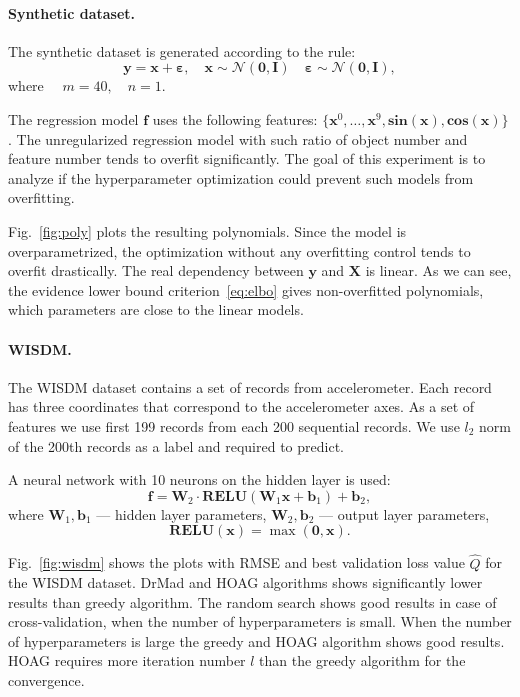 \documentclass[smallcondensed]{svjour3}
\begin{document}
\paragraph{Synthetic dataset.}
The synthetic dataset is generated according to the rule:
\[
	\mathbf{y} = \mathbf{x} + \boldsymbol{\varepsilon},\quad \mathbf{x}  \sim \mathcal{N}(\mathbf{0}, \mathbf{I}) \quad \boldsymbol{\varepsilon} \sim \mathcal{N}(\mathbf{0}, \mathbf{I}),
\]
where $\quad m = 40, \quad n = 1.$

The regression model $\mathbf{f}$ uses the following features: $\{\mathbf{x}^0, \dots, \mathbf{x}^9, \textbf{sin}(\mathbf{x}), \textbf{cos}(\mathbf{x})\}$. The unregularized regression model with such ratio of  object number and feature number tends to overfit significantly. The goal of this experiment is to analyze if the hyperparameter optimization could prevent such models from overfitting.

Fig.~\ref{fig:poly} plots the resulting polynomials.  Since the model is overparametrized, the optimization without any overfitting control tends to overfit drastically. The real dependency between $\mathbf{y}$ and $\mathbf{X}$ is linear. As we can see, the evidence lower bound criterion~\eqref{eq:elbo} gives non-overfitted polynomials, which parameters are close to the linear models.

\paragraph{WISDM.}
The WISDM dataset contains a set of records from accelerometer. Each record has three coordinates that correspond to the accelerometer axes. As a set of features we use first 199  records from each 200 sequential records. We use $l_2$ norm of the 200th records as a label and required to predict. 

A neural network with 10 neurons on the hidden layer is used:
\[
    \mathbf{f} = \mathbf{W}_2 \cdot \textbf{RELU}(\mathbf{W}_1\mathbf{x} + \mathbf{b}_1) +\mathbf{b}_2,
\]
where $\mathbf{W}_1, \mathbf{b}_1$ --- hidden layer parameters,
$\mathbf{W}_2, \mathbf{b}_2$ --- output layer parameters,
\[
    \textbf{RELU}(\mathbf{x}) = \max(\mathbf{0}, \mathbf{x}).
\]

Fig.~\ref{fig:wisdm} shows the plots with RMSE and best validation loss value $\hat{Q}$ for the WISDM dataset.
DrMad and HOAG algorithms shows significantly lower results than greedy algorithm. The random search shows good results in case of cross-validation, when the number of hyperparameters is small. When the number of hyperparameters is large the greedy and HOAG algorithm shows good results. HOAG requires more iteration number $l$ than the greedy algorithm for the convergence.
\end{document}
